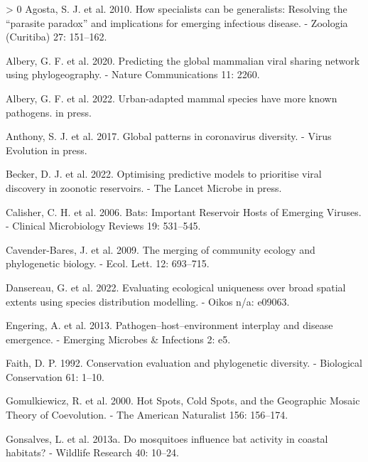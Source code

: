 \documentclass[11pt]{article}
\newlength{\cslhangindent}
\newenvironment{CSLReferences}[3] %
 {%
  \setlength{\parindent}{0pt}
  \ifodd #1 \everypar{\setlength{\hangindent}{\cslhangindent}}\ignorespaces\fi
  \ifnum #2 > 0
  \setlength{\parskip}{#2\baselineskip}
  \fi
 }%
 {}
\begin{document}
\hypertarget{refs}{}
\begin{CSLReferences}{1}{0}
\leavevmode\hypertarget{ref-Agosta2010HowSpe}{}%
Agosta, S. J. et al. 2010. How specialists can be generalists: Resolving
the {``parasite paradox''} and implications for emerging infectious
disease. - Zoologia (Curitiba) 27: 151--162.

\leavevmode\hypertarget{ref-Albery2020PreGlo}{}%
Albery, G. F. et al. 2020. Predicting the global mammalian viral sharing
network using phylogeography. - Nature Communications 11: 2260.

\leavevmode\hypertarget{ref-Albery2022UrbMam}{}%
Albery, G. F. et al. 2022. Urban-adapted mammal species have more known
pathogens. in press.

\leavevmode\hypertarget{ref-Anthony2017GloPat}{}%
Anthony, S. J. et al. 2017. Global patterns in coronavirus diversity. -
Virus Evolution in press.

\leavevmode\hypertarget{ref-Becker2022OptPre}{}%
Becker, D. J. et al. 2022. Optimising predictive models to prioritise
viral discovery in zoonotic reservoirs. - The Lancet Microbe in press.

\leavevmode\hypertarget{ref-Calisher2006BatImp}{}%
Calisher, C. H. et al. 2006. Bats: Important Reservoir Hosts of Emerging
Viruses. - Clinical Microbiology Reviews 19: 531--545.

\leavevmode\hypertarget{ref-Cavender-Bares2009MerCom}{}%
Cavender-Bares, J. et al. 2009. The merging of community ecology and
phylogenetic biology. - Ecol. Lett. 12: 693--715.

\leavevmode\hypertarget{ref-Dansereau2022EvaEco}{}%
Dansereau, G. et al. 2022. Evaluating ecological uniqueness over broad
spatial extents using species distribution modelling. - Oikos n/a:
e09063.

\leavevmode\hypertarget{ref-Engering2013PatHos}{}%
Engering, A. et al. 2013. Pathogen--host--environment interplay and
disease emergence. - Emerging Microbes \& Infections 2: e5.

\leavevmode\hypertarget{ref-Faith1992ConEva}{}%
Faith, D. P. 1992. Conservation evaluation and phylogenetic diversity. -
Biological Conservation 61: 1--10.

\leavevmode\hypertarget{ref-Gomulkiewicz2000HotSpo}{}%
Gomulkiewicz, R. et al. 2000. Hot Spots, Cold Spots, and the Geographic
Mosaic Theory of Coevolution. - The American Naturalist 156: 156--174.

\leavevmode\hypertarget{ref-Gonsalves2013MosInf}{}%
Gonsalves, L. et al. 2013a. Do mosquitoes influence bat activity in
coastal habitats? - Wildlife Research 40: 10--24.


\end{CSLReferences}
\end{document}
